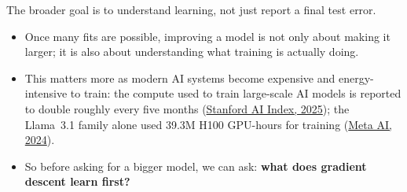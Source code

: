 \documentclass[aspectratio=169,9pt]{beamer}
\begin{document}
\begin{frame}
	\vspace{0.5em}
	{\textcolor{muted}{The broader goal is to understand learning, not just report a final test error.}}

	\vspace{3mm}
	{\small
		\begin{itemize}
			\setlength{\itemsep}{3.5mm}

			\item Once many fits are possible, improving a model is not only about making it larger; it is also about understanding what training is actually doing.

			      \pause
			\item This matters more as modern AI systems become expensive and energy-intensive to train:
			      the compute used to train large-scale AI models is reported to double roughly every five months
			      (\textcolor{muted}{\href{https://hai.stanford.edu/ai-index/2025-ai-index-report/research-and-development}{Stanford AI Index, 2025}}); the Llama~3.1 family alone used 39.3M H100 GPU-hours for training (\textcolor{muted}{\href{https://github.com/meta-llama/llama-models/blob/main/models/llama3_1/MODEL_CARD.md}{Meta AI, 2024}}).

			      \pause
			\item So before asking for a bigger model, we can ask: \textbf{what does gradient descent learn first?}
		\end{itemize}
	}
\end{frame}
\end{document}
